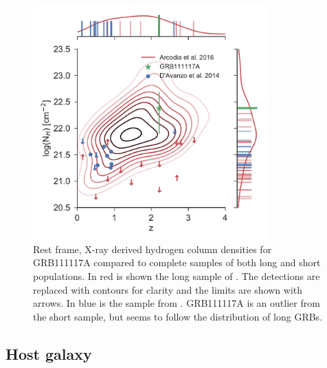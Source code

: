\documentclass{aa}    %
\begin{document}
\begin{figure}
	\centering
	\includegraphics[width=9cm]{figures/NH_z.pdf}
	\caption{Rest frame, X-ray derived hydrogen column densities for GRB111117A compared to complete samples of both long and short populations. In red is shown the long sample of \citet{Arcodia2016}. The detections are replaced with contours for clarity and the limits are shown with arrows. In blue is the sample from \citet{DAvanzo2014a}. GRB111117A is an outlier from the short sample, but seems to follow the distribution of long GRBs.}
	\label{fig:NH_z}
\end{figure}



\subsection{Host galaxy}
\end{document}
